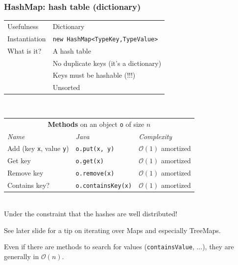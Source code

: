 \documentclass[8pt,aspectratio=169]{beamer}
\begin{document}
\begin{frame}
\frametitle{HashMap: hash table (dictionary)}
\centering
\begin{tabular}{ll}
	Usefulness & Dictionary\\
	Instantiation & \texttt{new HashMap<TypeKey,TypeValue>}\\
	What is it? & A hash table\\
	& \color{red} No duplicate keys (it's a dictionary)\\
	& \color{red} Keys must be hashable (!!!)\\
	& \color{red} Unsorted
	
\end{tabular}\\
\vspace{0.5cm}
\centering
\begin{tabular}{lll}
	\multicolumn{3}{c}{\textbf{Methods} on an object \texttt{o} of size $n$} \\
	\textit{Name} & \textit{Java} & \textit{Complexity} \\
	Add (key \texttt{x}, value \texttt{y})& \texttt{o.put(x, y)} & $\mathcal{O}(1)$ \color{orange} amortized\\
	Get key & \texttt{o.get(x)} & $\mathcal{O}(1)$ \color{orange} amortized\\
	Remove key & \texttt{o.remove(x)} & $\mathcal{O}(1)$ \color{orange} amortized\\
	Contains key? & \texttt{o.containsKey(x)} & $\mathcal{O}(1)$ \color{orange} amortized\\
\end{tabular}\\
\vspace{0.5cm}
\color{blue} Under the constraint that the hashes are well distributed!

\color{blue} See later slide for a tip on iterating over Maps and especially TreeMaps.

\color{red} Even if there are methods to search for values (\texttt{containsValue}, ...), they are generally in $\mathcal{O}(n)$.
\end{frame}
\end{document}
